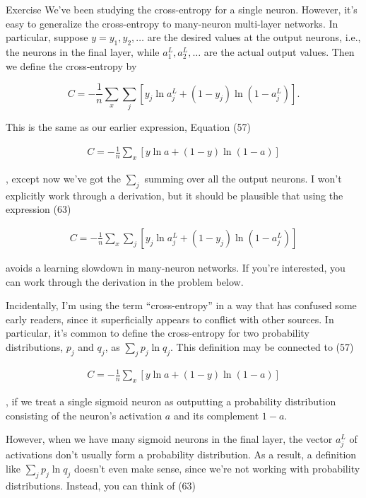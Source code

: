 \begin{exerciseBox}{Exercise}
We've been studying the cross-entropy for a single neuron. However, it's easy to generalize the cross-entropy to many-neuron multi-layer networks. In particular, suppose $y = y_1, y_2, \ldots$ are the desired values at the output neurons, i.e., the neurons in the final layer, while $a^L_1, a^L_2, \ldots$ are the actual output values. Then we define the cross-entropy by

\begin{equation}
C = -\frac{1}{n} \sum_x \sum_j \left[y_j \ln a^L_j + (1-y_j) \ln (1-a^L_j) \right].
\tag{63}
\end{equation}

\noindent This is the same as our earlier expression, Equation (57)

\begin{align*}
C = -\frac{1}{n} \sum_x \left[y \ln a + (1-y ) \ln (1-a) \right] \nonumber
\end{align*}

\noindent, except now we've got the $\sum_j$ summing over all the output neurons. I won't explicitly work through a derivation, but it should be plausible that using the expression (63)

\begin{align*}
C = -\frac{1}{n} \sum_x \sum_j \left[y_j \ln a^L_j + (1-y_j) \ln (1-a^L_j) \right] \nonumber
\end{align*}

\noindent avoids a learning slowdown in many-neuron networks. If you're interested, you can work through the derivation in the problem below.


Incidentally, I'm using the term ``cross-entropy'' in a way that has confused some early readers, since it superficially appears to conflict with other sources. In particular, it's common to define the cross-entropy for two probability distributions, $p_j$ and $q_j$, as $\sum_j p_j \ln q_j$. This definition may be connected to (57)

\begin{align*}
C = -\frac{1}{n} \sum_x \left[y \ln a + (1-y ) \ln (1-a) \right] \nonumber
\end{align*}

\noindent, if we treat a single sigmoid neuron as outputting a probability distribution consisting of the neuron's activation $a$ and its complement $1-a$.


However, when we have many sigmoid neurons in the final layer, the vector $a^L_j$ of activations don't usually form a probability distribution. As a result, a definition like $\sum_j p_j \ln q_j$ doesn't even make sense, since we're not working with probability distributions. Instead, you can think of (63)


\end{exerciseBox}
